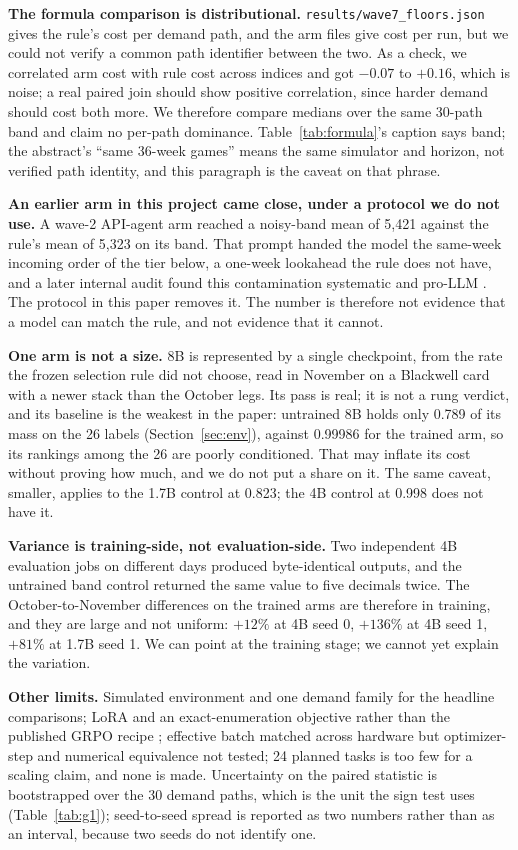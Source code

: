 \documentclass[11pt]{article}
\begin{document}
\textbf{The formula comparison is distributional.} \texttt{results/wave7\_floors.json} gives the rule's
cost per demand path, and the arm files give cost per run, but we could not verify a common path
identifier between the two. As a check, we correlated arm cost with rule cost across indices and got
$-0.07$ to $+0.16$, which is noise; a real paired join should show positive correlation, since harder
demand should cost both more. We therefore compare medians over the same 30-path band and claim no
per-path dominance. Table~\ref{tab:formula}'s caption says band; the abstract's ``same 36-week games''
means the same simulator and horizon, not verified path identity, and this paragraph is the caveat on
that phrase.

\textbf{An earlier arm in this project came close, under a protocol we do not use.} A wave-2 API-agent
arm reached a noisy-band mean of 5{,}421 against the rule's mean of 5{,}323 on its band. That prompt handed the model
the same-week incoming order of the tier below, a one-week lookahead the rule does not have, and a
later internal audit found this contamination systematic and pro-LLM \cite{audit}. The protocol in
this paper removes it. The number is therefore not evidence that a model can match the rule, and not
evidence that it cannot.

\textbf{One arm is not a size.} 8B is represented by a single checkpoint, from the rate the frozen
selection rule did not choose, read in November on a Blackwell card with a newer stack than the
October legs. Its pass is real; it is not a rung verdict, and its baseline is the weakest in the paper: untrained
8B holds only 0.789 of its mass on the 26 labels (Section~\ref{sec:env}), against 0.99986 for the
trained arm, so its rankings among the 26 are poorly conditioned. That may inflate its cost without
proving how much, and we do not put a share on it. The same caveat, smaller, applies
to the 1.7B control at 0.823; the 4B control at 0.998 does not have it.

\textbf{Variance is training-side, not evaluation-side.} Two independent 4B evaluation jobs on different
days produced byte-identical outputs, and the untrained band control returned the same value to five
decimals twice. The October-to-November differences on the trained arms are therefore in training, and
they are large and not uniform: $+12\%$ at 4B seed 0, $+136\%$ at 4B seed 1, $+81\%$ at 1.7B seed 1.
We can point at the training stage; we cannot yet explain the variation.

\textbf{Other limits.} Simulated environment and one demand family for the headline comparisons; LoRA and
an exact-enumeration objective rather than the published GRPO recipe \cite{grpo}; effective batch
matched across hardware but optimizer-step and numerical equivalence not tested; 24 planned tasks is
too few for a scaling claim, and none is made. Uncertainty on the paired statistic is bootstrapped
over the 30 demand paths, which is the unit the sign test uses (Table~\ref{tab:g1}); seed-to-seed
spread is reported as two numbers rather than as an interval, because two seeds do not identify one.
\end{document}
